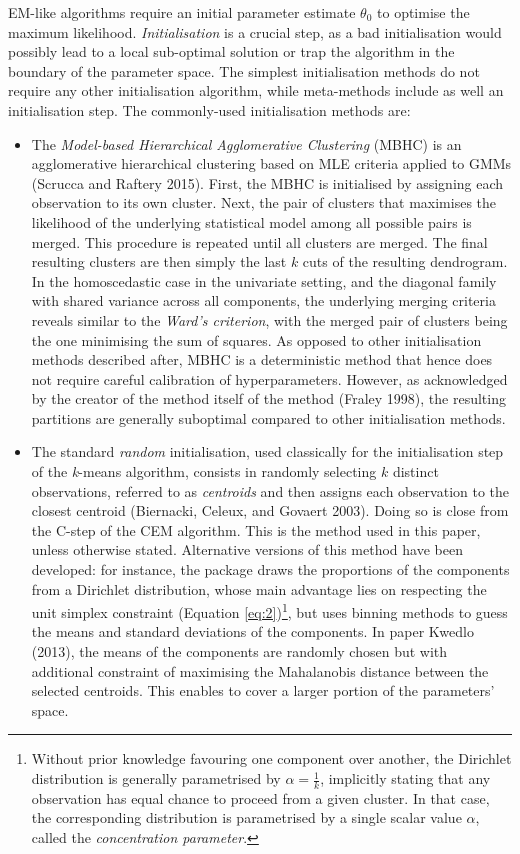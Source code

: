EM-like algorithms require an initial parameter estimate \(\theta_0\) to
optimise the maximum likelihood. \emph{Initialisation} is a crucial step, as
a bad initialisation would possibly lead to a local sub-optimal solution
or trap the algorithm in the boundary of the parameter space. The
simplest initialisation methods do not require any other initialisation
algorithm, while meta-methods include as well an initialisation step.
The commonly-used initialisation methods are:

\begin{itemize}
\item
  The \emph{Model-based Hierarchical Agglomerative Clustering} (MBHC) is
  an agglomerative hierarchical clustering based on MLE criteria applied to
  GMMs (Scrucca and Raftery 2015). First, the MBHC is
  initialised by assigning each observation to its own cluster. Next,
  the pair of clusters that maximises the likelihood of the underlying
  statistical model among all possible pairs is merged. This procedure
  is repeated until all clusters are merged. The final resulting
  clusters are then simply the last \(k\) cuts of the resulting
  dendrogram. In the homoscedastic case in the univariate setting, and the diagonal family with shared variance across all components, the underlying
  merging criteria reveals similar to the \emph{Ward's criterion}, with the
  merged pair of clusters being the one minimising the sum of squares.
  As opposed to other initialisation methods described after, MBHC is a
  deterministic method that hence does not require careful calibration of
  hyperparameters. However, as acknowledged by the creator of the method itself of the method (Fraley 1998), the resulting partitions are generally
  suboptimal compared to other initialisation methods.
\item
  The standard \emph{random} initialisation, used classically for the
  initialisation step of the \emph{k}-means algorithm, consists in randomly
  selecting \(k\) distinct observations, referred to as \emph{centroids} and
  then assigns each observation to the closest centroid
  (Biernacki, Celeux, and Govaert 2003). Doing so is close from the C-step of the CEM algorithm.
  This is the method used in this paper, unless otherwise stated. Alternative versions of this method have been developed: for instance, the package  draws the proportions of the components from a Dirichlet distribution, whose main advantage lies on respecting the unit simplex constraint (Equation \eqref{eq:2})\footnote{Without prior knowledge favouring one component over another, the Dirichlet distribution is generally parametrised by \(\alpha=\frac{1}{k}\), implicitly stating that any observation has equal chance to proceed from a given cluster. In that case, the corresponding distribution is parametrised by a single scalar value \(\alpha\), called the \emph{concentration parameter}.}, but uses binning methods to guess the means and standard deviations of the components. In paper Kwedlo (2013), the means of the components are randomly chosen but with additional constraint of maximising the Mahalanobis distance between the selected centroids. This enables to cover a larger portion of the parameters' space.

\end{itemize}
